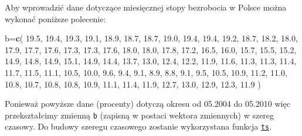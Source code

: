 \documentclass[polish,]{book}
\newenvironment{Shaded}{\begin{snugshade}}{\end{snugshade}}
\newcommand{\FloatTok}[1]{\textcolor[rgb]{0.00,0.00,0.81}{#1}}
\newcommand{\KeywordTok}[1]{\textcolor[rgb]{0.13,0.29,0.53}{\textbf{#1}}}
\newcommand{\NormalTok}[1]{#1}
\begin{document}
Aby wprowadzić dane dotyczące miesięcznej stopy bezrobocia w
Polsce można wykonać poniższe polecenie:

\begin{Shaded}
\begin{Highlighting}[]
\NormalTok{b=}\KeywordTok{c}\NormalTok{(}
\FloatTok{19.5}\NormalTok{, }\FloatTok{19.4}\NormalTok{, }\FloatTok{19.3}\NormalTok{, }\FloatTok{19.1}\NormalTok{, }\FloatTok{18.9}\NormalTok{, }\FloatTok{18.7}\NormalTok{, }\FloatTok{18.7}\NormalTok{, }\FloatTok{19.0}\NormalTok{, }\FloatTok{19.4}\NormalTok{, }\FloatTok{19.4}\NormalTok{, }\FloatTok{19.2}\NormalTok{, }\FloatTok{18.7}\NormalTok{,}
\FloatTok{18.2}\NormalTok{, }\FloatTok{18.0}\NormalTok{, }\FloatTok{17.9}\NormalTok{, }\FloatTok{17.7}\NormalTok{, }\FloatTok{17.6}\NormalTok{, }\FloatTok{17.3}\NormalTok{, }\FloatTok{17.3}\NormalTok{, }\FloatTok{17.6}\NormalTok{, }\FloatTok{18.0}\NormalTok{, }\FloatTok{18.0}\NormalTok{, }\FloatTok{17.8}\NormalTok{, }\FloatTok{17.2}\NormalTok{,}
\FloatTok{16.5}\NormalTok{, }\FloatTok{16.0}\NormalTok{, }\FloatTok{15.7}\NormalTok{, }\FloatTok{15.5}\NormalTok{, }\FloatTok{15.2}\NormalTok{, }\FloatTok{14.9}\NormalTok{, }\FloatTok{14.8}\NormalTok{, }\FloatTok{14.9}\NormalTok{, }\FloatTok{15.1}\NormalTok{, }\FloatTok{14.9}\NormalTok{, }\FloatTok{14.4}\NormalTok{, }\FloatTok{13.7}\NormalTok{,}
\FloatTok{13.0}\NormalTok{, }\FloatTok{12.4}\NormalTok{, }\FloatTok{12.2}\NormalTok{, }\FloatTok{11.9}\NormalTok{, }\FloatTok{11.6}\NormalTok{, }\FloatTok{11.3}\NormalTok{, }\FloatTok{11.3}\NormalTok{, }\FloatTok{11.4}\NormalTok{, }\FloatTok{11.7}\NormalTok{, }\FloatTok{11.5}\NormalTok{, }\FloatTok{11.1}\NormalTok{, }\FloatTok{10.5}\NormalTok{,}
\FloatTok{10.0}\NormalTok{, }\FloatTok{9.6}\NormalTok{,  }\FloatTok{9.4}\NormalTok{,  }\FloatTok{9.1}\NormalTok{,  }\FloatTok{8.9}\NormalTok{,  }\FloatTok{8.8}\NormalTok{,  }\FloatTok{9.1}\NormalTok{,  }\FloatTok{9.5}\NormalTok{,  }\FloatTok{10.5}\NormalTok{, }\FloatTok{10.9}\NormalTok{, }\FloatTok{11.2}\NormalTok{, }\FloatTok{11.0}\NormalTok{,}
\FloatTok{10.8}\NormalTok{, }\FloatTok{10.7}\NormalTok{, }\FloatTok{10.8}\NormalTok{, }\FloatTok{10.8}\NormalTok{, }\FloatTok{10.9}\NormalTok{, }\FloatTok{11.1}\NormalTok{, }\FloatTok{11.4}\NormalTok{, }\FloatTok{11.9}\NormalTok{, }\FloatTok{12.7}\NormalTok{, }\FloatTok{13.0}\NormalTok{, }\FloatTok{12.9}\NormalTok{, }\FloatTok{12.3}\NormalTok{,}
\FloatTok{11.9}
\NormalTok{)}
\end{Highlighting}
\end{Shaded}

Ponieważ powyższe dane (procenty) dotyczą okresu od 05.2004 do 05.2010 więc przekształcimy zmienną \texttt{b}
(zapisną w postaci wektora zmiennych) w szereg czasowy. Do budowy szeregu czasowego zostanie wykorzystana funkcja \href{https://rdrr.io/r/stats/ts.html}{\texttt{ts}}.
\end{document}
